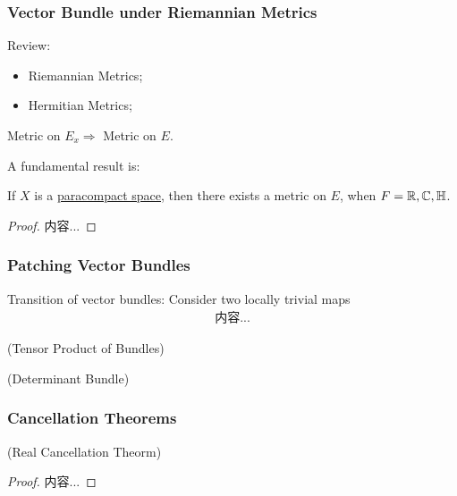 \documentclass[Total.tex]{subfiles}
\begin{document}
	\subsubsection{Vector Bundle under Riemannian Metrics}
	
	Review:
	
	\begin{itemize}
		\item Riemannian Metrics;
		\item Hermitian Metrics;
	\end{itemize}
	
	Metric on $E_x\Rightarrow$ Metric on $E$.
	
	A fundamental result is:
	
	\begin{theorem}
		\label{Algebraic-K-Theory-Vector-Bundles-Metrics-on-Paracompact-Space}If $X$ is a \underline{paracompact space}, then there exists a metric on $E$, when $F=\mathbb{R},\mathbb{C},\mathbb{H}$.
	\end{theorem}
	\begin{proof}
		内容...
	\end{proof}
	
	\subsubsection{Patching Vector Bundles}
	
	{\LARGE T}ransition of vector bundles: Consider two locally trivial maps
	\begin{gather*}
		内容...
	\end{gather*}
	
	\begin{Def}
		(Tensor Product of Bundles)
	\end{Def}
	
	\begin{Def}
		(Determinant Bundle)
	\end{Def}
	
	\subsubsection{Cancellation Theorems}
	
	\begin{theorem}
		(Real Cancellation Theorm)
	\end{theorem}
	
	\begin{proof}
		内容...
	\end{proof}
	
\end{document}
